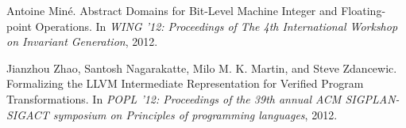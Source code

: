 \documentclass[a4paper]{book}
\begin{document}
\begin{thebibliography}{9}
 Antoine Miné.  Abstract Domains for Bit-Level Machine
  Integer and Floating-point Operations.  In \emph{WING '12:
    Proceedings of The 4th International Workshop on Invariant
    Generation}, 2012.

 Jianzhou Zhao, Santosh Nagarakatte, Milo
  M. K. Martin, and Steve Zdancewic.  Formalizing the LLVM
  Intermediate Representation for Verified Program Transformations. In
  \emph{POPL '12: Proceedings of the 39th annual ACM SIGPLAN-SIGACT
    symposium on Principles of programming languages}, 2012.

\end{thebibliography}

\clearpage
{}
\printindex
\end{document}
